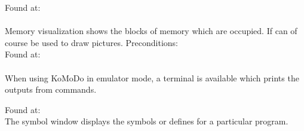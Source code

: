\graphicspath{ {images/extra/} }

Found at: \\\\
Memory visualization shows the blocks of memory which are occupied. If can of course be used to draw pictures.
\pagebreak
{}
Preconditions: \\
Found at: \\\\
When using KoMoDo in emulator mode, a terminal is available which prints the outputs from  commands.
\pagebreak

Found at: \\
The symbol window displays the symbols or defines for a particular program.
